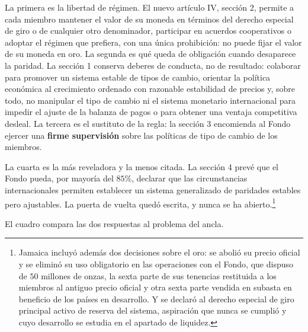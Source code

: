 \documentclass[10pt,a4paper]{article}
\begin{document}
La primera es la libertad de régimen. El nuevo artículo IV, sección 2, permite a cada miembro mantener el valor de su moneda en términos del derecho especial de giro o de cualquier otro denominador, participar en acuerdos cooperativos o adoptar el régimen que prefiera, con una única prohibición: no puede fijar el valor de su moneda en oro. La segunda es qué queda de obligación cuando desaparece la paridad. La sección 1 conserva deberes de conducta, no de resultado: colaborar para promover un sistema estable de tipos de cambio, orientar la política económica al crecimiento ordenado con razonable estabilidad de precios y, sobre todo, no manipular el tipo de cambio ni el sistema monetario internacional para impedir el ajuste de la balanza de pagos o para obtener una ventaja competitiva desleal. La tercera es el sustituto de la regla: la sección 3 encomienda al Fondo ejercer una \textbf{firme supervisión} sobre las políticas de tipo de cambio de los miembros.

La cuarta es la más reveladora y la menos citada. La sección 4 prevé que el Fondo pueda, por mayoría del $85\%$, declarar que las circunstancias internacionales permiten establecer un sistema generalizado de paridades estables pero ajustables. La puerta de vuelta quedó escrita, y nunca se ha abierto.\footnote{%
    Jamaica incluyó además dos decisiones sobre el oro: se abolió su precio oficial y se eliminó su uso obligatorio en las operaciones con el Fondo, que dispuso de $50$ millones de onzas, la sexta parte de sus tenencias restituida a los miembros al antiguo precio oficial y otra sexta parte vendida en subasta en beneficio de los países en desarrollo. Y se declaró al derecho especial de giro principal activo de reserva del sistema, aspiración que nunca se cumplió y cuyo desarrollo se estudia en el apartado de liquidez.
}

El cuadro compara las dos respuestas al problema del ancla.
\end{document}
